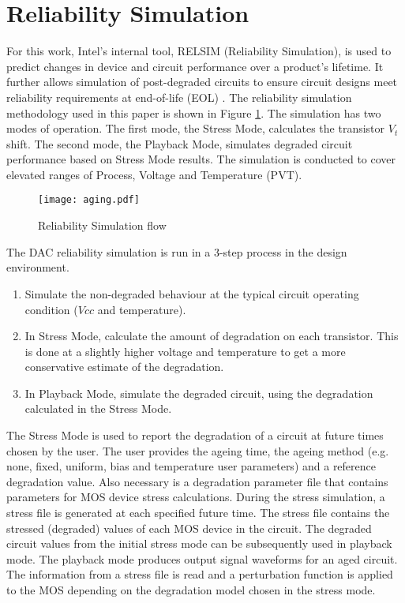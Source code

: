 \documentclass[11pt,a4paper]{article}
\begin{document}
\section{Reliability Simulation}
For this work,  Intel's internal tool, RELSIM (Reliability Simulation), is used to predict changes in device and circuit performance over a product's lifetime. It further allows simulation of post-degraded circuits to ensure circuit designs meet reliability requirements at end-of-life (EOL) \cite{Latif}. The reliability simulation methodology used in this paper is shown in Figure \ref{fig:aNicePicture}. The simulation has two modes of operation. The first mode, the Stress Mode, calculates the transistor $V_t$ shift. The second mode, the Playback Mode, simulates degraded circuit performance based on Stress Mode results. The simulation is conducted to cover elevated ranges of Process, Voltage and Temperature (PVT). 

\begin{figure}[tbp]
\centering
\texttt{[image: aging.pdf]}
\caption{Reliability Simulation flow}
\label{fig:aNicePicture}
\end{figure}







The DAC reliability simulation is run in a 3-step process in the design environment.

\begin{enumerate}
\item Simulate the non-degraded behaviour at the typical circuit operating condition ($Vcc$ and temperature).

\item In Stress Mode, calculate the amount of degradation on each transistor.  This is done at a slightly higher voltage and temperature to get a more conservative estimate of the degradation.  

\item In Playback Mode, simulate the degraded circuit, using the degradation calculated in the Stress Mode. \end{enumerate}

The Stress Mode is used to report the degradation of a circuit at future times chosen by the user. The user provides the ageing time, the ageing method  (e.g. none, fixed, uniform, bias and temperature user parameters) and a reference degradation value. Also necessary is a degradation parameter file that contains parameters for MOS device stress calculations. During the stress simulation, a stress file is generated at each specified future time. The stress file contains the stressed (degraded) values of each MOS device in the circuit. The degraded circuit values from the initial stress mode can be subsequently used in playback mode. The playback mode produces output signal waveforms for an aged circuit. The information from a stress file is read and a perturbation function is applied to the MOS depending on the degradation model chosen in the stress mode.
\end{document}

